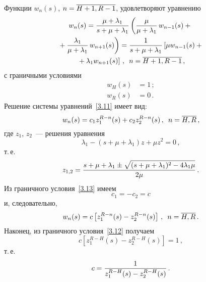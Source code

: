 \begin{multicols}{2}
Функции $w_n(s)$, $n\hm =\overline{H+1,R-1}$, удовлетворяют уравнению
\begin{multline}
w_{n}(s) = \displaystyle\frac{\displaystyle \mu+\lambda_1\mathstrut}{\displaystyle  s + \mu+\lambda_1\mathstrut}
\left( \displaystyle\frac{\displaystyle \mu\mathstrut}{\displaystyle \mu+\lambda_1\mathstrut}\, w_{n-1}(s) +{}\right.\\
\left.{}+
\displaystyle\frac{\displaystyle \lambda_1\mathstrut}{\displaystyle \mu+\lambda_1\mathstrut}\, w_{n+1}(s) \right)
=  \displaystyle\frac{\displaystyle 1\mathstrut}{\displaystyle  s + \mu+\lambda_1\mathstrut} \left[
\mu w_{n-1}(s) +{}\right.\\
\left.{}+ \lambda_1 w_{n+1}(s)\right] \,,\enskip n=\overline{H+1,R-1}\,,
\label{3.11}
\end{multline}
с граничными условиями
\begin{align}
\label{3.12}
w_{H}(s) &= 1\,;
\\
\label{3.13}
w_{R}(s) &= 0 \,.
\end{align}
Решение системы уравнений~\eqref{3.11} имеет вид:
\begin{equation*}
w_{n}(s) = c_1 z_1^{R-n}(s) + c_2 z_2^{R-n}(s)\,,\enskip n=\overline{H,R}\,,
\end{equation*}
где $z_1$, $z_2$~--- решения уравнения
\begin{equation*}
\lambda_1 - (s + \mu + \lambda_1) z + \mu z^2 = 0\,,
\end{equation*}
т.\,е.
\begin{equation*}
z_{1,2} = \displaystyle\frac{\displaystyle  s+\mu+\lambda_1 \pm \sqrt {(s+\mu+\lambda_1)^2 - 4 \lambda_1 \mu}
\mathstrut}{\displaystyle 2 \mu \mathstrut}\,.
\end{equation*}
Из граничного условия~\eqref{3.13} имеем
\begin{equation*}
c_1 = -c_2 = c 
\end{equation*}
и, следовательно,
\begin{equation*}
w_{n}(s) = c \left[z_1^{R-n}(s) - z_2^{R-n}(s)\right]
\,,\enskip n=\overline{H,R}\,. 
\end{equation*}
Наконец, из граничного условия~\eqref{3.12} получаем
\begin{equation*}
c \left[z_1^{R-H}(s) - z_2^{R-H}(s)\right] = 1\,,
\end{equation*}
т.\,е.\
\begin{equation*}
c = \displaystyle\frac{\displaystyle  1\mathstrut}{\displaystyle z_1^{R-H}(s) - z_2^{R-H}(s)\mathstrut}\,.
\end{equation*}


\end{multicols}

